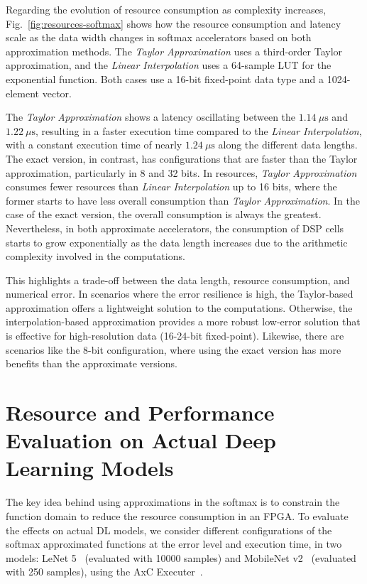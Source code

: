 \documentclass[conference]{IEEEtran}
\begin{document}
Regarding the evolution of resource consumption as complexity increases, Fig.~\ref{fig:resources-softmax} shows how the resource consumption and latency scale as the data width changes in softmax accelerators based on both approximation methods. The \emph{Taylor Approximation} uses a third-order Taylor approximation, and the \emph{Linear Interpolation} uses a 64-sample LUT for the exponential function. Both cases use a 16-bit fixed-point data type and a 1024-element vector.

The \emph{Taylor Approximation} shows a latency oscillating between the $1.14~ \mu\text{s}$ and $1.22~\mu\text{s}$, resulting in a faster execution time compared to the \emph{Linear Interpolation}, with a constant execution time of nearly $1.24~\mu\text{s}$ along the different data lengths. The exact version, in contrast, has configurations that are faster than the Taylor approximation, particularly in 8 and 32 bits. In resources, \emph{Taylor Approximation} consumes fewer resources than \emph{Linear Interpolation} up to 16 bits, where the former starts to have less overall consumption than \emph{Taylor Approximation}. In the case of the exact version, the overall consumption is always the greatest. Nevertheless, in both approximate accelerators, the consumption of DSP cells starts to grow exponentially as the data length increases due to the arithmetic complexity involved in the computations.

This highlights a trade-off between the data length, resource consumption, and numerical error. In scenarios where the error resilience is high, the Taylor-based approximation offers a lightweight solution to the computations. Otherwise, the interpolation-based approximation provides a more robust low-error solution that is effective for high-resolution data (16-24-bit fixed-point). Likewise, there are scenarios like the 8-bit configuration, where using the exact version has more benefits than the approximate versions.

\section{Resource and Performance Evaluation on Actual Deep Learning Models}

The key idea behind using approximations in the softmax is to constrain the function domain to reduce the resource consumption in an FPGA. To evaluate the effects on actual DL models, we consider different configurations of the softmax approximated functions at the error level and execution time, in two models: LeNet 5~\cite{lenet}  (evaluated with 10000 samples) and MobileNet v2~\cite{mobilenetv2} (evaluated with 250 samples), using the AxC Executer~\cite{axcexecuter}.
\end{document}
